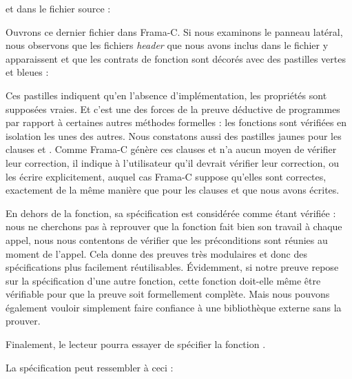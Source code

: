 et dans le fichier source :






Ouvrons ce dernier fichier dans Frama-C. Si nous examinons le panneau latéral,
nous observons que les fichiers \textit{header} que nous avons inclus dans le fichier
 y apparaissent et que les contrats de fonction sont décorés avec des
pastilles vertes et bleues :





Ces pastilles indiquent qu'en l'absence d'implémentation, les propriétés sont
supposées vraies. Et c'est une des forces de la preuve déductive de programmes
par rapport à certaines autres méthodes formelles : les fonctions sont vérifiées
en isolation les unes des autres. Nous constatons aussi des pastilles jaunes pour
les clauses  et . Comme Frama-C génère
ces clauses et n'a aucun moyen de vérifier leur correction, il indique à
l'utilisateur qu'il devrait vérifier leur correction, ou les écrire
explicitement, auquel cas Frama-C suppose qu'elles sont correctes,
exactement de la même manière que pour les clauses  et
 que nous avons écrites.


En dehors de la fonction, sa spécification est considérée comme étant
vérifiée : nous ne cherchons pas à reprouver que la fonction fait bien son travail
à chaque appel, nous nous contentons de vérifier que les préconditions sont
réunies au moment de l'appel. Cela donne des preuves très modulaires et donc
des spécifications plus facilement réutilisables. Évidemment, si notre preuve
repose sur la spécification d'une autre fonction, cette fonction doit-elle même
être vérifiable pour que la preuve soit formellement complète. Mais nous pouvons
également vouloir simplement faire confiance à une bibliothèque externe sans la
prouver.



Finalement, le lecteur pourra essayer de spécifier la fonction .



La spécification peut ressembler à ceci :









